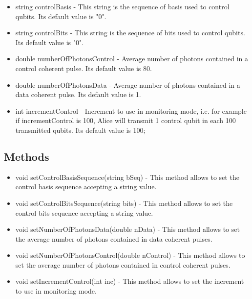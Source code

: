 	\begin{itemize}
        \item string controlBasis - This string is the sequence of basis used to control qubits. Its default value is "0".

        \item string controlBits - This string is the sequence of bits used to control qubits. Its default value is "0".

		\item double numberOfPhotonsControl - Average number of photons contained in a control coherent pulse. Its default value is 80.
	
		\item double numberOfPhotonsData - Average number of photons contained in a data coherent pulse. Its default value is 1.

        \item int incrementControl - Increment to use in monitoring mode, i.e. for example if incrementControl is 100, Alice will transmit 1 control qubit in each 100 transmitted qubits. Its default value is 100;
	\end{itemize}

\subsection*{Methods}
\begin{itemize}
        \item void setControlBasisSequence(string bSeq) - This method allows to set the control basis sequence accepting a string value.

        \item void setControlBitsSequence(string bits) - This method allows to set the control bits sequence accepting a string value.

		\item void setNumberOfPhotonsData(double nData) - This method allows to set the average number of photons contained in data coherent pulses.
	
		\item void setNumberOfPhotonsControl(double nControl) - This method allows to set the average number of photons contained in control coherent pulses.

        \item void setIncrementControl(int inc) - This method allows to set the increment to use in monitoring mode.

\end{itemize}

